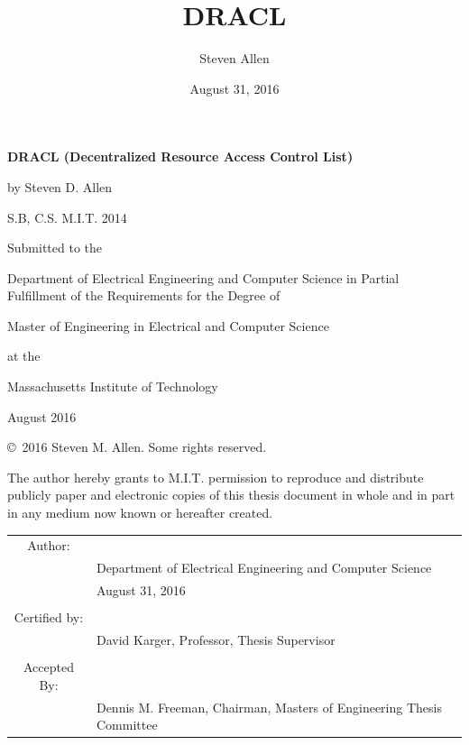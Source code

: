 \documentclass[pdftex,12pt,a4papaer,twoside,notitlepage]{report}
\title{DRACL}
\author{Steven Allen}
\date{August 31, 2016}
\begin{document}

\begin{titlingpage}
{


\setlength{\parskip}{1em}
\begin{center}

\textbf{DRACL (Decentralized Resource Access Control List)}

by Steven D. Allen

S.B, C.S. M.I.T. 2014

\vspace{2em}

Submitted to the

Department of Electrical Engineering and Computer Science in
Partial Fulfillment of the Requirements for the Degree of

Master of Engineering in Electrical and Computer Science

at the

Massachusetts Institute of Technology

August 2016

\copyright~2016 Steven M. Allen. Some rights reserved.

The author hereby grants to M.I.T. permission to reproduce and distribute
publicly paper and electronic copies of this thesis document in whole and in
part in any medium now known or hereafter created.

\vspace{3em}
\begin{tabular}{c l}
  Author: & \hrulefill \\
  & {\small Department of Electrical Engineering and Computer Science } \\
  & {\small August 31, 2016 } \\
  \\
  Certified by: & \hrulefill \\
  & {\small David Karger, Professor, Thesis Supervisor } \\
  \\
  Accepted By: & \hrulefill \\
  & {\small Dennis M. Freeman, Chairman, Masters of Engineering Thesis Committee } \\
\end{tabular}
\end{center}
}

\end{titlingpage}
\end{document}
